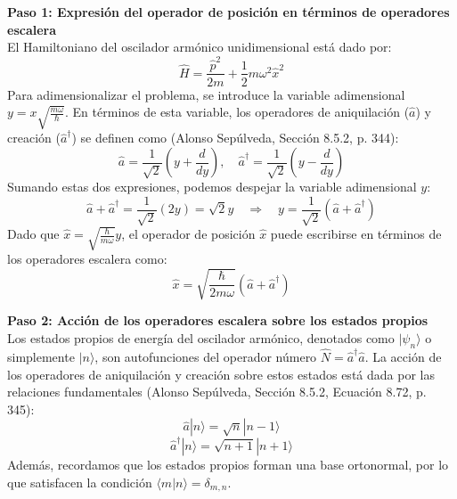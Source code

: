 \documentclass[a4paper]{article}
\begin{document}
\vspace{0.3cm}
\noindent\textbf{Paso 1: Expresión del operador de posición en términos de operadores escalera} \\
El Hamiltoniano del oscilador armónico unidimensional está dado por:
$$
\hat{H} = \frac{\hat{p}^2}{2m} + \frac{1}{2} m \omega^2 \hat{x}^2
$$
Para adimensionalizar el problema, se introduce la variable adimensional $y = x \sqrt{\frac{m\omega}{\hbar}}$. En términos de esta variable, los operadores de aniquilación ($\hat{a}$) y creación ($\hat{a}^\dagger$) se definen como (Alonso Sepúlveda, Sección 8.5.2, p. 344):
$$
\hat{a} = \frac{1}{\sqrt{2}} \left( y + \frac{d}{dy} \right), \quad \hat{a}^\dagger = \frac{1}{\sqrt{2}} \left( y - \frac{d}{dy} \right)
$$
Sumando estas dos expresiones, podemos despejar la variable adimensional $y$:
$$
\hat{a} + \hat{a}^\dagger = \frac{1}{\sqrt{2}} (2y) = \sqrt{2} y \quad \Longrightarrow \quad y = \frac{1}{\sqrt{2}} (\hat{a} + \hat{a}^\dagger)
$$
Dado que $\hat{x} = \sqrt{\frac{\hbar}{m\omega}} y$, el operador de posición $\hat{x}$ puede escribirse en términos de los operadores escalera como:
$$
\hat{x} = \sqrt{\frac{\hbar}{2m\omega}} (\hat{a} + \hat{a}^\dagger)
$$

\vspace{0.3cm}
\noindent\textbf{Paso 2: Acción de los operadores escalera sobre los estados propios} \\
Los estados propios de energía del oscilador armónico, denotados como $|\psi_n\rangle$ o simplemente $|n\rangle$, son autofunciones del operador número $\hat{N} = \hat{a}^\dagger \hat{a}$. La acción de los operadores de aniquilación y creación sobre estos estados está dada por las relaciones fundamentales (Alonso Sepúlveda, Sección 8.5.2, Ecuación 8.72, p. 345):
$$
\hat{a} |n\rangle = \sqrt{n} |n-1\rangle
$$
$$
\hat{a}^\dagger |n\rangle = \sqrt{n+1} |n+1\rangle
$$
Además, recordamos que los estados propios forman una base ortonormal, por lo que satisfacen la condición $\langle m | n \rangle = \delta_{m,n}$.
\end{document}
